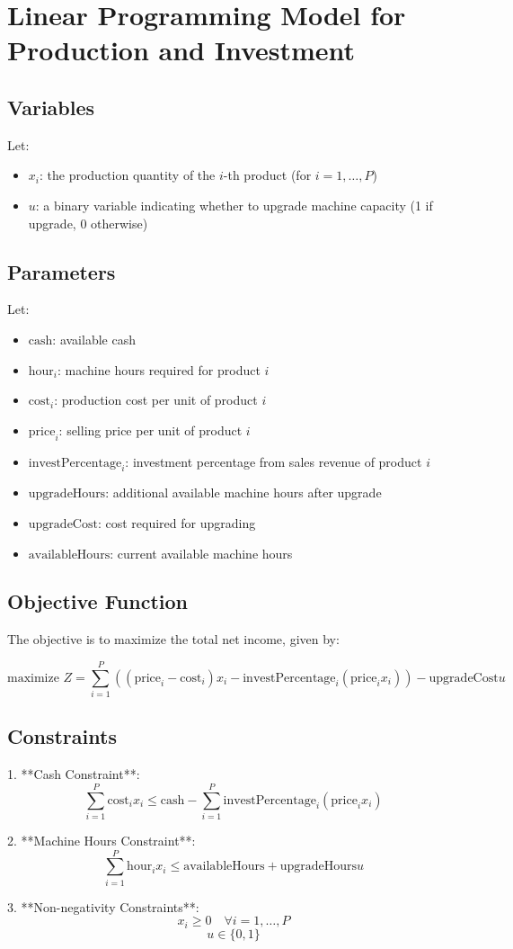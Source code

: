 \documentclass{article}
\begin{document}
\section*{Linear Programming Model for Production and Investment}

\subsection*{Variables}
Let:
\begin{itemize}
    \item \( x_i \): the production quantity of the \( i \)-th product (for \( i = 1, \ldots, P \))
    \item \( u \): a binary variable indicating whether to upgrade machine capacity (1 if upgrade, 0 otherwise)
\end{itemize}

\subsection*{Parameters}
Let:
\begin{itemize}
    \item \( \text{cash} \): available cash
    \item \( \text{hour}_i \): machine hours required for product \( i \)
    \item \( \text{cost}_i \): production cost per unit of product \( i \)
    \item \( \text{price}_i \): selling price per unit of product \( i \)
    \item \( \text{investPercentage}_i \): investment percentage from sales revenue of product \( i \)
    \item \( \text{upgradeHours} \): additional available machine hours after upgrade
    \item \( \text{upgradeCost} \): cost required for upgrading
    \item \( \text{availableHours} \): current available machine hours
\end{itemize}

\subsection*{Objective Function}
The objective is to maximize the total net income, given by:

\[
\text{maximize } Z = \sum_{i=1}^{P} \left( (\text{price}_i - \text{cost}_i) x_i - \text{investPercentage}_i (\text{price}_i x_i) \right) - \text{upgradeCost} u
\]

\subsection*{Constraints}
1. **Cash Constraint**:
\[
\sum_{i=1}^{P} \text{cost}_i x_i \leq \text{cash} - \sum_{i=1}^{P} \text{investPercentage}_i (\text{price}_i x_i)
\]

2. **Machine Hours Constraint**:
\[
\sum_{i=1}^{P} \text{hour}_i x_i \leq \text{availableHours} + \text{upgradeHours} u
\]

3. **Non-negativity Constraints**:
\[
x_i \geq 0 \quad \forall i = 1, \ldots, P
\]
\[
u \in \{0, 1\}
\]
\end{document}
